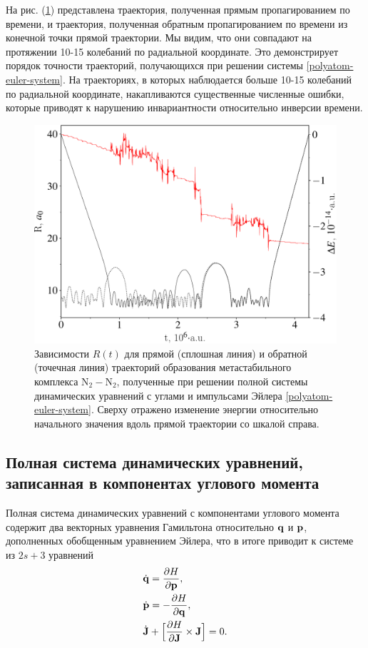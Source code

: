 На рис. (\ref{fig:euler-trajectory}) представлена траектория, полученная прямым пропагированием по времени, и траектория, полученная обратным пропагированием по времени из конечной точки прямой траектории. Мы видим, что они совпадают на протяжении 10-15 колебаний по радиальной координате. Это демонстрирует порядок точности траекторий, получающихся при решении системы \eqref{polyatom-euler-system}. На траекториях, в которых наблюдается больше 10-15 колебаний по радиальной координате, накапливаются существенные численные ошибки, которые приводят к нарушению инвариантности относительно инверсии времени.

\setcounter{figure}{3}
\begin{figure}[H]
    \centering
    \includegraphics[width=0.85\linewidth]{./pictures/trajectories/euler_trajectory-crop.pdf}
\caption{Зависимости $R(t)$ для прямой (сплошная линия) и обратной (точечная линия) траекторий образования метастабильного комплекса N$_2-$N$_2$, полученные при решении полной системы динамических уравнений с углами и импульсами Эйлера \eqref{polyatom-euler-system}. Сверху отражено изменение энергии относительно начального значения вдоль прямой траектории со шкалой справа.}
    \label{fig:euler-trajectory}
\end{figure}

\subsection{Полная система динамических уравнений, записанная в компонентах углового момента}
    Полная система динамических уравнений с компонентами углового момента содержит два векторных уравнения Гамильтона относительно $\mathbf{q}$ и $\mathbf{p}$, дополненных обобщенным уравнением Эйлера, что в итоге приводит к системе из $2s + 3$ уравнений
\begin{gather}
    \begin{aligned}
        &\dot{\mathbf{q}} = \frac{\partial H}{\partial \mathbf{p}}, \\
        &\dot{\mathbf{p}} = -\frac{\partial H}{\partial \mathbf{q}}, \\
        &\dot{\mathbf{J}} + \Big[ \frac{\partial H}{\partial \mathbf{J}} \times \mathbf{J} \Big] = 0.
    \end{aligned}
\end{gather}

